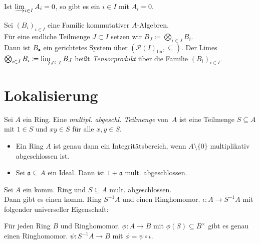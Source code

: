 \documentclass{cheat-sheet}
\newcommand{\PS}{\mathcal{P}} %
\newcommand{\aaa}{\mathfrak{a}}
\begin{document}
\begin{prop}
  Ist $\varinjlim_{i \in I} A_i = 0$, so gibt es ein $i \in I$ mit $A_i = 0$.
\end{prop}

\begin{defn}
  Sei $(B_i)_{i \in I}$ eine Familie kommutativer $A$-Algebren. \\
  Für eine endliche Teilmenge $J \subset I$ setzen wir $B_J \coloneqq \bigotimes_{i \in J} B_i$. \\
  Dann ist $B_\bullet$ ein gerichtetes System über $(\PS(I)_{\text{fin}}, \subseteq)$.
  Der Limes $\bigotimes_{i \in I} B_i \coloneqq \varinjlim_{J \subseteq I} B_J$ heißt \emph{Tensorprodukt} über die Familie $(B_i)_{i \in I}$.
\end{defn}

\section{Lokalisierung}



\begin{defn}
  Sei $A$ ein Ring.
  Eine \emph{multipl. abgeschl. Teilmenge} von~$A$ ist eine Teilmenge $S \subseteq A$ mit $1 \in S$ und $xy \in S$ für alle $x, y \in S$.
\end{defn}

\begin{bspe}
  \begin{itemize}
    \item Ein Ring $A$ ist genau dann ein Integritätsbereich, wenn $A \setminus \{ 0 \}$ multiplikativ abgeschlossen ist.
    \item Sei $\aaa \subseteq A$ ein Ideal. Dann ist $1 + \aaa$ mult. abgeschlossen.
  \end{itemize}
\end{bspe}

\begin{prop}
  Sei $A$ ein komm. Ring und $S \subseteq A$ mult. abgeschlossen. \\
  Dann gibt es einen komm. Ring $S^{-1} A$ und einen Ringhomomor. $\iota : A \to S^{-1} A$ mit folgender universeller Eigenschaft:
  
  \hfill\begin{minipage}{0.95 \linewidth}
    Für jeden Ring $B$ und Ringhomomor. $\phi : A \to B$ mit $\phi(S) \subseteq B^{\times}$ gibt es genau einen Ringhomomor. $\psi : S^{-1} A \to B$ mit $\phi = \psi \circ \iota$.
  \end{minipage}
\end{prop}
\end{document}
